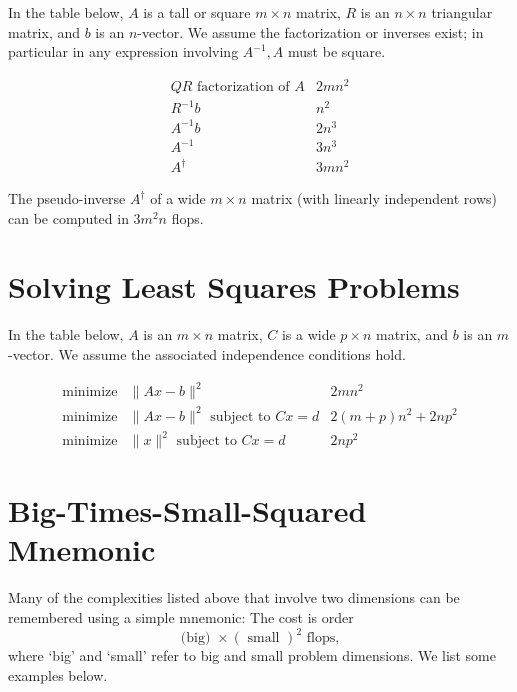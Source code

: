 In the table below, $ A $ is a tall or square $ m \times n $ matrix, $ R $ is an $ n \times n $ triangular matrix, and $ b $ is an $ n $-vector. We assume the factorization or inverses exist; in particular in any expression involving $ A^{-1}, A $ must be square.

\begin{equation} \begin{array}{ll}{QR} \text { factorization of } A & 2 m n^{2} \\ R^{-1} b & n^{2} \\ A^{-1} b & 2 n^{3} \\ A^{-1} & 3 n^{3} \\ A^{\dagger} & 3 m n^{2}\end{array} \end{equation}

The pseudo-inverse $ A^{\dagger} $ of a wide $ m \times n $ matrix (with linearly independent rows) can be computed in $ 3 m^{2} n $ flops.

\section{Solving Least Squares Problems}

In the table below, $ A $ is an $ m \times n $ matrix, $ C $ is a wide $ p \times n $ matrix, and $ b $ is an $ m $-vector. We assume the associated independence conditions hold.

\begin{equation} \begin{array}{lll}\operatorname{minimize} & \|A x-b\|^{2} & 2 m n^{2} \\ \operatorname { minimize } & \|A x-b\|^{2} \text { subject to } C x=d & 2(m+p) n^{2}+2 n p^{2} \\ \operatorname { minimize } &\|x\|^{2} \text { subject to } C x=d & 2 n p^{2}\end{array} \end{equation}

\section{Big-Times-Small-Squared Mnemonic}

Many of the complexities listed above that involve two dimensions can be remembered using a simple mnemonic: The cost is order
\begin{equation}
\text { (big) } \times(\text { small })^{2} \text { flops, }
\end{equation}
where `big' and `small' refer to big and small problem dimensions. We list some examples below.


